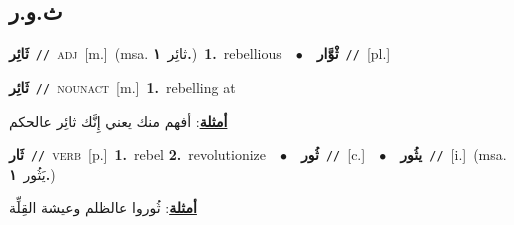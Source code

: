 \documentclass[10pt,a4paper,twoside]{article} %
\begin{document}
\begin{multicols}{2}
\vspace{-3mm}
\subsection*{\color{blue}\foreignlanguage{arabic}{ث.و.ر}\color{blue}{}} 

{\setlength\topsep{0pt}\textbf{\foreignlanguage{arabic}{ثَائِر}}\ {\color{gray}\texttt{//}\color{black}}\ \textsc{adj}\ [m.]\ \color{gray}(msa. \foreignlanguage{arabic}{ثائِر}~\foreignlanguage{arabic}{\textbf{١.}})\color{black}\ \textbf{1.}~rebellious\ \ $\bullet$\ \ \setlength\topsep{0pt}\textbf{\foreignlanguage{arabic}{ثْوَّار}}\ {\color{gray}\texttt{//}\color{black}}\ [pl.]\ } \vspace{2mm}

{\setlength\topsep{0pt}\textbf{\foreignlanguage{arabic}{ثَائِر}}\ {\color{gray}\texttt{//}\color{black}}\ \textsc{noun\textunderscore act}\ [m.]\ \textbf{1.}~rebelling at\  \begin{flushright}\color{gray}\foreignlanguage{arabic}{\textbf{\underline{\foreignlanguage{arabic}{أمثلة}}}: أفهم منك يعني إِنَّك ثائِر عالحكم}\end{flushright}\color{black}} \vspace{2mm}

{\setlength\topsep{0pt}\textbf{\foreignlanguage{arabic}{ثَار}}\ {\color{gray}\texttt{//}\color{black}}\ \textsc{verb}\ [p.]\ \textbf{1.}~rebel  \textbf{2.}~revolutionize\ \ $\bullet$\ \ \setlength\topsep{0pt}\textbf{\foreignlanguage{arabic}{ثُور}}\ {\color{gray}\texttt{//}\color{black}}\ [c.]\ \ $\bullet$\ \ \setlength\topsep{0pt}\textbf{\foreignlanguage{arabic}{يثُور}}\ {\color{gray}\texttt{//}\color{black}}\ [i.]\ \color{gray}(msa. \foreignlanguage{arabic}{يَثُور}~\foreignlanguage{arabic}{\textbf{١.}})\color{black}\  \begin{flushright}\color{gray}\foreignlanguage{arabic}{\textbf{\underline{\foreignlanguage{arabic}{أمثلة}}}: ثُوروا عالظلم وعيشة القِلِّة}\end{flushright}\color{black}} \vspace{2mm}


\end{multicols}
\end{document}
